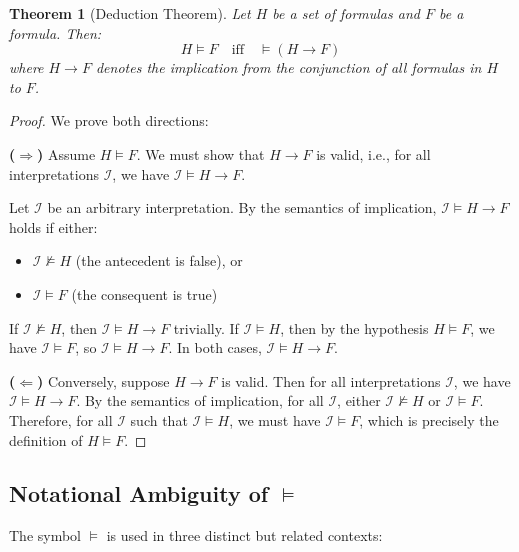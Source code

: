 \documentclass[11pt,a4paper]{article}
\theoremstyle{definition}
\theoremstyle{plain}
\newtheorem{theorem}{Theorem}[section]
\theoremstyle{remark}
\begin{document}
\begin{tcolorbox}[colback=teal!10!white,colframe=teal!75!black,title=\textbf{Deduction Theorem}]
\begin{theorem}[Deduction Theorem]
Let $H$ be a set of formulas and $F$ be a formula. Then:
\[
H \models F \quad \text{iff} \quad \models (H \rightarrow F)
\]
where $H \rightarrow F$ denotes the implication from the conjunction of all formulas in $H$ to $F$.
\end{theorem}
\end{tcolorbox}

\begin{proof}
We prove both directions:

\textbf{($\Rightarrow$)} Assume $H \models F$. We must show that $H \rightarrow F$ is valid, i.e., for all interpretations $\mathcal{I}$, we have $\mathcal{I} \models H \rightarrow F$.

Let $\mathcal{I}$ be an arbitrary interpretation. By the semantics of implication, $\mathcal{I} \models H \rightarrow F$ holds if either:
\begin{itemize}
    \item $\mathcal{I} \not\models H$ (the antecedent is false), or
    \item $\mathcal{I} \models F$ (the consequent is true)
\end{itemize}

If $\mathcal{I} \not\models H$, then $\mathcal{I} \models H \rightarrow F$ trivially. If $\mathcal{I} \models H$, then by the hypothesis $H \models F$, we have $\mathcal{I} \models F$, so $\mathcal{I} \models H \rightarrow F$. In both cases, $\mathcal{I} \models H \rightarrow F$.

\textbf{($\Leftarrow$)} Conversely, suppose $H \rightarrow F$ is valid. Then for all interpretations $\mathcal{I}$, we have $\mathcal{I} \models H \rightarrow F$. By the semantics of implication, for all $\mathcal{I}$, either $\mathcal{I} \not\models H$ or $\mathcal{I} \models F$. Therefore, for all $\mathcal{I}$ such that $\mathcal{I} \models H$, we must have $\mathcal{I} \models F$, which is precisely the definition of $H \models F$.
\end{proof}

\subsection{Notational Ambiguity of $\models$}

The symbol $\models$ is used in three distinct but related contexts:
\end{document}
